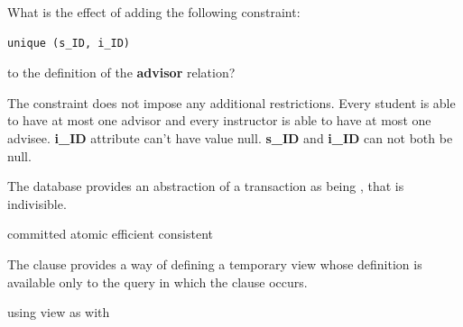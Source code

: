 \documentclass[12pt, addpoints, answers]{exam}
\begin{document}
\begin{questions}
\begin{minipage}{\linewidth}
\question[3]
What is the effect of adding the following constraint:\par
\begin{verbatim}
unique (s_ID, i_ID)
\end{verbatim}
to the definition of the \textbf{advisor} relation?\par\vspace{0.5em}
\begin{checkboxes}
    \CorrectChoice The constraint does not impose any additional restrictions.
    \choice Every student is able to have at most one advisor and every instructor is able to have at most one advisee.
    \choice \textbf{i\_ID} attribute can't have value null.
    \choice \textbf{s\_ID} and \textbf{i\_ID} can not both be null.
\end{checkboxes}
\end{minipage}\vspace{1em}

\begin{minipage}{\linewidth}
\question[2]
The database provides an abstraction of a transaction as being \underline{\hspace{4em}}, that is indivisible.\par\vspace{0.5em}
\begin{checkboxes}
    \choice committed
    \CorrectChoice atomic
    \choice efficient
    \choice consistent
\end{checkboxes}
\end{minipage}\vspace{1em}

\begin{minipage}{\linewidth}
\question[2]
The \underline{\hspace{4em}} clause provides a way of defining a temporary view whose definition is available only to the query in which the clause occurs.\par\vspace{0.5em}
\begin{checkboxes}
    \choice using
    \choice view
    \choice as
    \CorrectChoice with
\end{checkboxes}
\end{minipage}\vspace{1em}


\end{questions}
\end{document}
